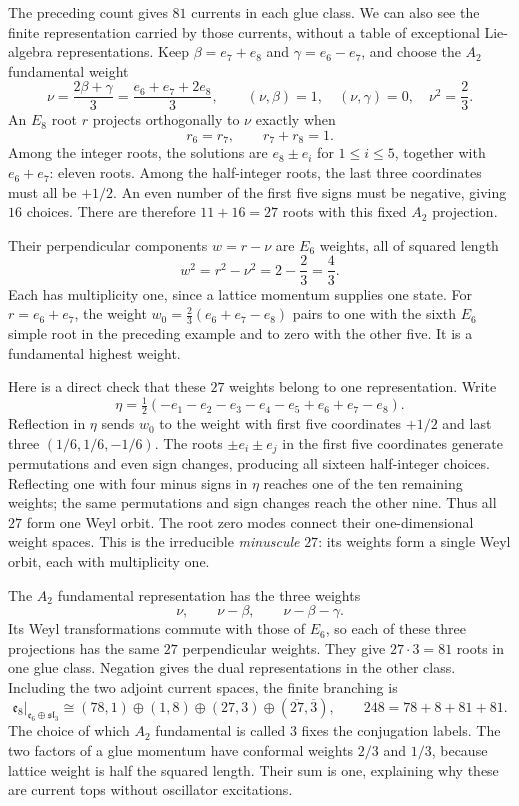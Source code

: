 \begin{example}
\label{ex:char-E8-glue-weights}
The preceding count gives $81$ currents in each glue class.
We can also see the finite representation carried by those currents,
without a table of exceptional Lie-algebra representations.
Keep $\beta=e_7+e_8$ and $\gamma=e_6-e_7$, and choose the
$A_2$ fundamental weight
\[
 \nu=\frac{2\beta+\gamma}{3}
     =\frac{e_6+e_7+2e_8}{3},
 \qquad (\nu,\beta)=1,\quad(\nu,\gamma)=0,\quad \nu^2=\frac23.
\]
An $E_8$ root $r$ projects orthogonally to $\nu$ exactly when
\[
 r_6=r_7,\qquad r_7+r_8=1.
\]
Among the integer roots, the solutions are
$e_8\pm e_i$ for $1\le i\le5$, together with $e_6+e_7$:
eleven roots. Among the half-integer roots, the last three
coordinates must all be $+1/2$. An even number of the first five
signs must be negative, giving $16$ choices. There are therefore
$11+16=27$ roots with this fixed $A_2$ projection.

Their perpendicular components $w=r-\nu$ are $E_6$ weights, all
of squared length
\[
 w^2=r^2-\nu^2=2-\frac23=\frac43.
\]
Each has multiplicity one, since a lattice momentum supplies one
state. For $r=e_6+e_7$, the weight
$w_0=\tfrac23(e_6+e_7-e_8)$ pairs to one with the sixth $E_6$
simple root in the preceding example and to zero with the other
five. It is a fundamental highest weight.

Here is a direct check that these $27$ weights belong to one
representation. Write
\[
 \eta=\tfrac12(-e_1-e_2-e_3-e_4-e_5+e_6+e_7-e_8).
\]
Reflection in $\eta$ sends $w_0$ to the weight with first five
coordinates $+1/2$ and last three $(1/6,1/6,-1/6)$.
The roots $\pm e_i\pm e_j$ in the first five coordinates generate
permutations and even sign changes, producing all sixteen
half-integer choices. Reflecting one with four minus signs in
$\eta$ reaches one of the ten remaining weights; the same
permutations and sign changes reach the other nine. Thus all
$27$ form one Weyl orbit. The root zero modes connect their
one-dimensional weight spaces. This is the irreducible
\emph{minuscule} $27$: its weights form a single Weyl orbit,
each with multiplicity one.

The $A_2$ fundamental representation has the three weights
\[
 \nu,\qquad \nu-\beta,\qquad \nu-\beta-\gamma.
\]
Its Weyl transformations commute with those of $E_6$, so each
of these three projections has the same $27$ perpendicular
weights. They give $27\cdot3=81$ roots in one glue class.
Negation gives the dual representations in the other class.
Including the two adjoint current spaces, the finite branching is
\[
 \mathfrak e_8\big|_{\mathfrak e_6\oplus\mathfrak{sl}_3}
 \cong(78,1)\oplus(1,8)\oplus(27,3)
                         \oplus(\overline{27},\overline3),
 \qquad 248=78+8+81+81.
\]
The choice of which $A_2$ fundamental is called $3$ fixes the
conjugation labels. The two factors of a glue momentum have
conformal weights $2/3$ and $1/3$, because lattice weight is half
the squared length. Their sum is one, explaining why these are
current tops without oscillator excitations.


\end{example}
